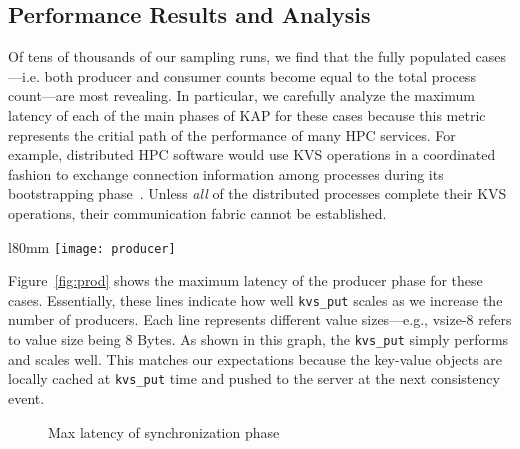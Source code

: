 \subsection{Performance Results and Analysis}
\label{results}
Of tens of thousands of our sampling runs, we find that the fully populated
cases---i.e. both producer and consumer counts become equal to the total
process count---are most revealing. In particular, we carefully analyze 
the maximum latency of each of the main phases of KAP for these cases 
because this metric represents the critial path of the performance of
many HPC services. For example, distributed 
HPC software would use KVS operations in a coordinated fashion to exchange 
connection information among processes during its bootstrapping 
phase~\cite{LIBI,PMI2}. Unless {\em all} 
of the distributed processes complete their
KVS operations, their communication fabric cannot be established. 

\begin{wrapfigure}{l}{80mm} 
  \centering
  \texttt{[image: producer]}
  \caption{Max latency of producer phase}
  \vspace{-.5cm}	
  \label{fig:prod}
\end{wrapfigure}

Figure~\ref{fig:prod} shows the maximum latency of the producer phase
for these cases. Essentially, these lines indicate how well {\tt kvs\_put}
scales as we increase the number of producers. Each line represents
different value sizes---e.g., vsize-8 refers to value size being
8 Bytes. As shown in this graph, the {\tt kvs\_put} simply performs and
scales well. This matches our expectations because the key-value objects
are locally cached at {\tt kvs\_put} time and pushed to the
server at the next consistency event. 

\ifcomments
{}

\begin{figure}[ht]
\centering
\begin{subfigure}[With unique values]{
  \texttt{[image: sync]}
  \label{fig:sync:noredund}
}%
\end{subfigure}
\begin{subfigure}[With redundant values]{
  \texttt{[image: sync]}
  \label{fig:sync:redund}
}%
\end{subfigure}
\caption{Max latency of synchronization phase}
\label{fig:sync}
\end{figure}


